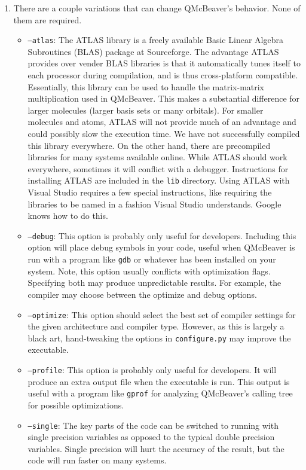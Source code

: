\documentclass[11pt]{article}
\begin{document}
\begin{enumerate}
\item There are a couple variations that can change QMcBeaver's behavior. None of them are required.
\begin{itemize}
\item {\tt --atlas}: The ATLAS library is a freely available Basic Linear Algebra Subroutines (BLAS) package at Sourceforge. The advantage ATLAS provides over vender BLAS libraries is that it automatically tunes itself to each processor during compilation, and is thus cross-platform compatible. Essentially, this library can be used to handle the matrix-matrix multiplication used in QMcBeaver. This makes a substantial difference for larger molecules (larger basis sets or many orbitals). For smaller molecules and atoms, ATLAS will not provide much of an advantage and could possibly slow the execution time.  We have not successfully compiled this library everywhere. On the other hand, there are precompiled libraries for many systems available online. While ATLAS should work everywhere, sometimes it will conflict with a debugger. Instructions for installing ATLAS are included in the {\tt lib} directory. Using ATLAS with Visual Studio requires a few special instructions, like requiring the libraries to be named in a fashion Visual Studio understands. Google knows how to do this.
\item {\tt --debug}: This option is probably only useful for developers. Including this option will place debug symbols in your code, useful when QMcBeaver is run with a program like {\tt gdb} or whatever has been installed on your system. Note, this option usually conflicts with optimization flags. Specifying both may produce unpredictable results. For example, the compiler may choose between the optimize and debug options.
\item {\tt --optimize}: This option should select the best set of compiler settings for the given architecture and compiler type. However, as this is largely a black art, hand-tweaking the options in {\tt configure.py} may improve the executable.
\item {\tt --profile}: This option is probably only useful for developers. It will produce an extra output file when the executable is run. This output is useful with a program like {\tt gprof} for analyzing QMcBeaver's calling tree for possible optimizations. 
\item {\tt --single}: The key parts of the code can be switched to running with single precision variables as opposed to the typical double precision variables. Single precision will hurt the accuracy of the result, but the code will run faster on many systems.
\end{itemize}
\end{enumerate}
\end{document}
